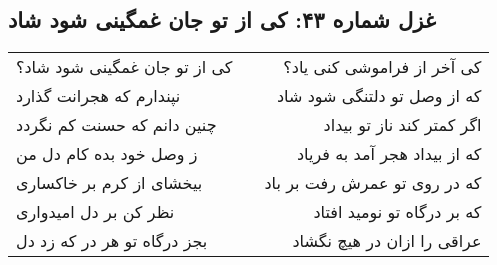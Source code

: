 \begin{center}
\section*{غزل شماره ۴۳: کی از تو جان غمگینی شود شاد}
\label{sec:043}
\begin{longtable}{l p{0.5cm} r}
کی از تو جان غمگینی شود شاد؟
&&
کی آخر از فراموشی کنی یاد؟
\\
نپندارم که هجرانت گذارد
&&
که از وصل تو دلتنگی شود شاد
\\
چنین دانم که حسنت کم نگردد
&&
اگر کمتر کند ناز تو بیداد
\\
ز وصل خود بده کام دل من
&&
که از بیداد هجر آمد به فریاد
\\
بیخشای از کرم بر خاکساری
&&
که در روی تو عمرش رفت بر باد
\\
نظر کن بر دل امیدواری
&&
که بر درگاه تو نومید افتاد
\\
بجز درگاه تو هر در که زد دل
&&
عراقی را ازان در هیچ نگشاد
\\
\end{longtable}
\end{center}
